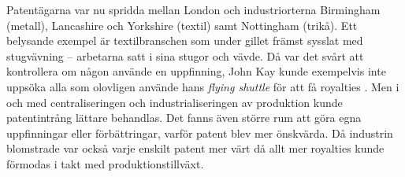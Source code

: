 Patentägarna var nu spridda mellan London och industriorterna Birmingham (metall), Lancashire och
Yorkshire (textil) samt Nottingham (trikå). Ett belysande exempel är textilbranschen som under gillet
främst sysslat med stugvävning -- arbetarna satt i sina stugor och vävde. Då var det svårt att
kontrollera om någon använde en uppfinning, John Kay kunde exempelvis inte uppsöka alla som olovligen
använde hans \emph{flying shuttle} för att få royalties \cite{macleod}. Men i och med centraliseringen och industrialiseringen av produktion kunde patentintrång lättare behandlas. Det fanns även större rum att göra
egna uppfinningar eller förbättringar, varför patent blev mer önskvärda. Då industrin blomstrade var
också varje enskilt patent mer värt då allt mer royalties kunde förmodas i takt med
produktionstillväxt.




%
%
%


